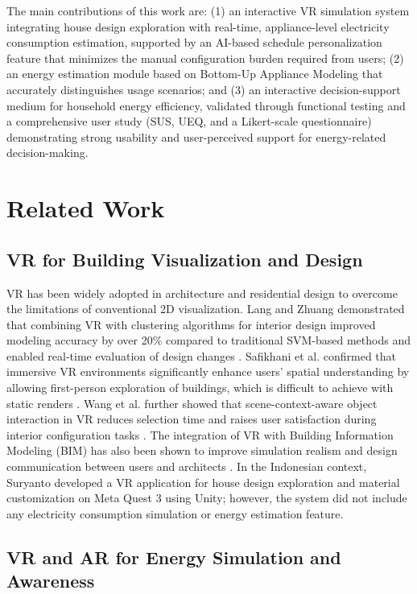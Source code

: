 \documentclass[conference]{IEEEtran}
\begin{document}
The main contributions of this work are: (1) an interactive VR simulation system integrating house design exploration with real-time, appliance-level electricity consumption estimation, supported by an AI-based schedule personalization feature that minimizes the manual configuration burden required from users; (2) an energy estimation module based on Bottom-Up Appliance Modeling that accurately distinguishes usage scenarios; and (3) an interactive decision-support medium for household energy efficiency, validated through functional testing and a comprehensive user study (SUS, UEQ, and a Likert-scale questionnaire) demonstrating strong usability and user-perceived support for energy-related decision-making.

\section{Related Work}

\subsection{VR for Building Visualization and Design}

VR has been widely adopted in architecture and residential design to overcome the limitations of conventional 2D visualization. Lang and Zhuang demonstrated that combining VR with clustering algorithms for interior design improved modeling accuracy by over 20\% compared to traditional SVM-based methods and enabled real-time evaluation of design changes \cite{InteractiveDesignVR}. Safikhani et al. confirmed that immersive VR environments significantly enhance users' spatial understanding by allowing first-person exploration of buildings, which is difficult to achieve with static renders \cite{ImnersiveVR2022}. Wang et al. further showed that scene-context-aware object interaction in VR reduces selection time and raises user satisfaction during interior configuration tasks \cite{SceneContextVR}. The integration of VR with Building Information Modeling (BIM) has also been shown to improve simulation realism and design communication between users and architects \cite{eudl2023vr, mdpi2025vr}. In the Indonesian context, Suryanto \cite{skripsikating} developed a VR application for house design exploration and material customization on Meta Quest 3 using Unity; however, the system did not include any electricity consumption simulation or energy estimation feature.

\subsection{VR and AR for Energy Simulation and Awareness}
\end{document}
